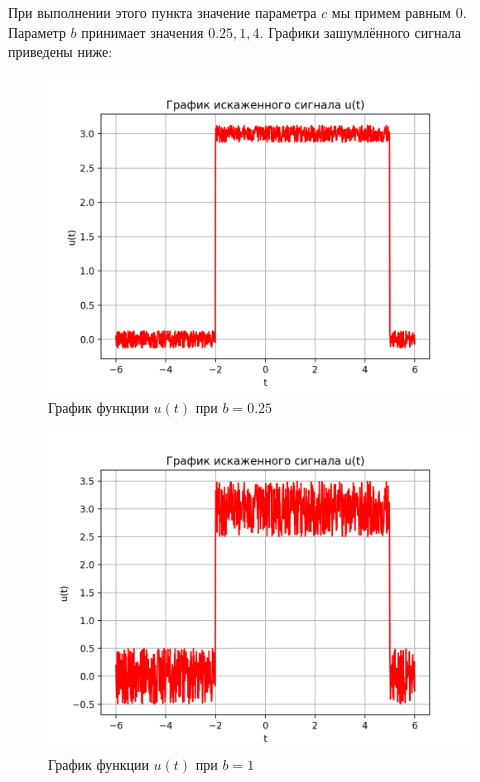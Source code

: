 При выполнении этого пункта значение параметра $c$ мы примем равным $0$. Параметр $b$ принимает значения $0.25, 1, 4$. Графики зашумлённого сигнала приведены ниже:

\begin{figure}[ht!]
    \centering
    \includegraphics[scale=0.75]{media/1 task/high_freq/Noisy_0,25.png}
    \caption{График функции $u(t)$ при $b=0.25$}
    \label{fig:noisy_025}
\end{figure}

\clearpage

\begin{figure}[ht!]
    \centering
    \includegraphics[scale=0.75]{media/1 task/high_freq/Noisy_1.png}
    \caption{График функции $u(t)$ при $b=1$}
    \label{fig:noisy_1}
\end{figure}

